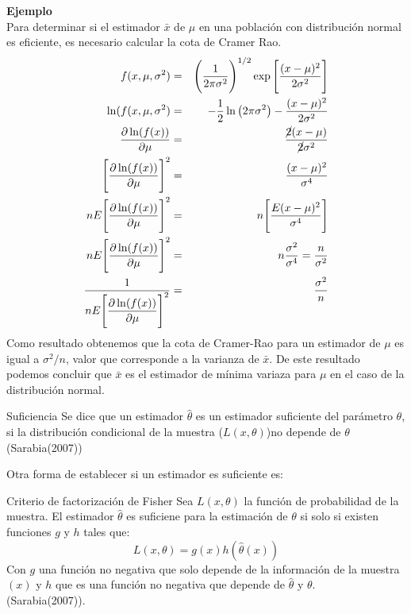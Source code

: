 \documentclass[base=hide,11pt]{elegantbook}
\begin{document}
{%
\textcolor{col3}{\bf \large Ejemplo}\\  
Para determinar si el estimador $\bar{x}$ de $\mu$ en una población con distribución normal es eficiente, es necesario calcular la cota de Cramer Rao.
			\begin{eqnarray*}
				f(x,\mu,\sigma^{2})&=&\Bigg(\dfrac{1}{2\pi \sigma^{2}}\Bigg)^{1/2} \exp{\Bigg[ \dfrac{(x-\mu)^{2}}{2 \sigma^{2}}\Bigg]}\\
				\ln(f(x,\mu,\sigma^{2})&=& -\frac{1}{2}\ln \big(2\pi \sigma^{2} \big)-\frac{(x-\mu)^{2}}{2\sigma^{2}}\\
					\dfrac{\partial\ln(f(x))}{\partial \mu}&=&\frac{\cancel{2}(x-\mu)}{\cancel{2} \sigma^{2}}\\
					\Bigg[ \dfrac{\partial\ln(f(x))}{\partial \mu} \Bigg]^{2}&=& \dfrac{(x-\mu)^{2}}{\sigma^{4}} \\
					n E \Bigg[ \dfrac{\partial\ln(f(x))}{\partial \mu} \Bigg]^{2}&=& n  \Bigg[ \dfrac{E(x-\mu)^{2}}{\sigma^{4}}\Bigg] \\
					n E \Bigg[ \dfrac{\partial\ln(f(x))}{\partial \mu} \Bigg]^{2}&=& n \frac{\sigma^{2}}{\sigma^{4}} = \frac{n}{\sigma^{2}} \\
					\dfrac{1}{n E \Bigg[ \dfrac{\partial\ln(f(x))}{\partial \mu} \Bigg]^{2}}&=& \dfrac{\sigma^{2}}{n}
				\end{eqnarray*}
%				
				Como resultado obtenemos que la cota de Cramer-Rao para un estimador de $\mu$ es igual a $\sigma^{2}/n$, valor que corresponde a la varianza de $\bar{x}$. De este resultado podemos concluir que $\bar{x}$ es el estimador de mínima variaza para $\mu$ en el caso de la distribución normal. \\
				
\begin{Box2}{Suficiencia} 
Se dice que un estimador $\widehat{\theta}$ es un estimador suficiente del parámetro $\theta$, si la distribución condicional de la muestra ($L(x,\theta)$)no depende de $\theta$ (Sarabia(2007)) \\
\end{Box2}				
Otra forma de establecer si un estimador es suficiente es:\\

		
\begin{Box2}{Criterio de factorización de Fisher} 
Sea $L(x,\theta)$ la función de probabilidad de la muestra. El estimador   $\widehat{\theta}$ es suficiene para la estimación de $\theta$ si  solo si existen funciones $g$ y $h$ tales que:
$$L(x,\theta)=g(x)h(\widehat{\theta}(x)) $$
Con $g$ una función no negativa que solo depende de la información de la muestra $(x)$ y $h$ que es una función no negativa que depende de 
$\widehat{\theta}$ y $\theta$. \\
(Sarabia(2007)).
\end{Box2}


}
\end{document}
